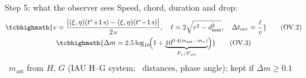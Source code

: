\begin{frame}{Step 5: what the observer sees}
  Speed, chord, duration and drop:
  \begin{gather*}
    \tcbhighmath{v = \frac{\bigl|(\xi,\eta)(t^{*}{+}1\,\mathrm{s}) - (\xi,\eta)(t^{*}{-}1\,\mathrm{s})\bigr|}{2\,\mathrm{s}},
    \quad
    \ell = 2\sqrt{r^2 - d_{\min}^2},
    \quad
    \Delta t_{\mathrm{occ}} = \frac{\ell}{v}} \tag{OV.2} \\
    \tcbhighmath{\Delta m = 2.5\log_{10}\!\Bigl(1 + \underbrace{10^{0.4(m_{\mathrm{ast}} - m_\star)}}_{F_\star / F_{\mathrm{ast}}}\Bigr)} \tag{OV.3}
  \end{gather*}
  {\small \OWN\ $m_{\mathrm{ast}}$ from $H$, $G$ (IAU H--G system; \SP\ distances, phase angle); kept if $\Delta m \ge 0.1$}
\end{frame}

